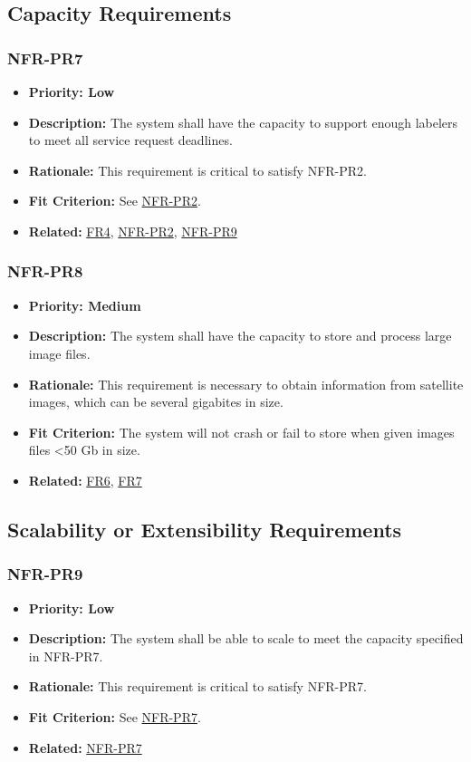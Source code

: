 \documentclass[12pt]{article}
\begin{document}
\subsection{Capacity Requirements}
\subsubsection*{NFR-PR7}
\label{sec:PR7}
\begin{itemize}
  \item \textbf{Priority: Low}
  \item \textbf{Description:} The system shall have the capacity to support enough labelers to meet all service request deadlines.
  \item \textbf{Rationale:} This requirement is critical to satisfy NFR-PR2.
  \item \textbf{Fit Criterion:} See \hyperref[sec:PR2]{NFR-PR2}.
  \item \textbf{Related:} \hyperref[sec:FR4]{FR4},  \hyperref[sec:PR2]{NFR-PR2},  \hyperref[sec:PR9]{NFR-PR9}
\end{itemize}
\subsubsection*{NFR-PR8}
\label{sec:PR8}
\begin{itemize}
  \item \textbf{Priority: Medium}
  \item \textbf{Description:} The system shall have the capacity to store and process large image files.
  \item \textbf{Rationale:} This requirement is necessary to obtain information from satellite images, which can be several gigabites in size.
  \item \textbf{Fit Criterion:} The system will not crash or fail to store when given images files <50 Gb in size.
  \item \textbf{Related:} \hyperref[sec:FR6]{FR6}, \hyperref[sec:FR7]{FR7}
\end{itemize}
\subsection{Scalability or Extensibility Requirements}
\subsubsection*{NFR-PR9}
\label{sec:PR9}
\begin{itemize}
  \item \textbf{Priority: Low}
  \item \textbf{Description:} The system shall be able to scale to meet the capacity specified in NFR-PR7.
  \item \textbf{Rationale:} This requirement is critical to satisfy NFR-PR7.
  \item \textbf{Fit Criterion:} See \hyperref[sec:PR7]{NFR-PR7}.
   \item \textbf{Related:} \hyperref[sec:PR7]{NFR-PR7}
\end{itemize}
\end{document}
